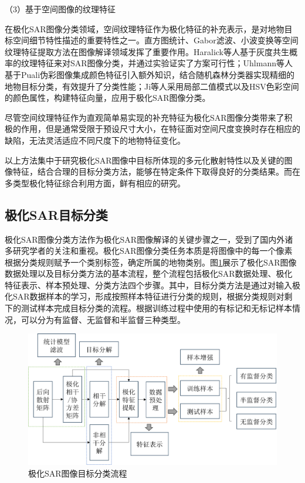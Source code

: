 （3）基于空间图像的纹理特征

在极化SAR图像分类领域，空间纹理特征作为极化特征的补充表示，是对地物目标空间细节特性描述的重要特性之一。直方图统计、Gabor滤波、小波变换等空间纹理特征提取方法在图像解译领域发挥了重要作用。Haralick等人基于灰度共生概率的纹理特征来对SAR图像分类，并通过实验证实了方案可行性；Uhlmann等人基于Puali伪彩图像集成颜色特征引入额外知识，结合随机森林分类器实现精细的地物目标分类，有效提升了分类性能；Ji等人采用局部二值模式以及HSV色彩空间的颜色属性，构建特征向量，应用于极化SAR图像分类。

尽管空间纹理特征作为直观简单易实现的补充特征为极化SAR图像分类带来了积极的作用，但是通常受限于预设尺寸大小，在特征面对空间尺度变换时存在相应的缺陷，无法灵活适应不同尺度下的地物特征变化。

以上方法集中于研究极化SAR图像中目标所体现的多元化散射特性以及关键的图像特征，结合合理的目标分类方法，能够在特定条件下取得良好的分类结果。而在多类型极化特征综合利用方面，鲜有相应的研究。

\subsection{极化SAR目标分类}
极化SAR图像分类方法作为极化SAR图像解译的关键步骤之一，受到了国内外诸多研究学者的关注和重视。极化SAR图像分类任务本质是将图像中的每一个像素根据分类规则赋予一个类别标签，确定所属的地物类别。图\ref{fig:极化SAR图像目标分类流程}展示了极化SAR图像数据处理以及目标分类方法的基本流程，整个流程包括极化SAR数据处理、极化特征表示、样本预处理、分类方法四个步骤。其中，目标分类方法是通过对输入极化SAR数据样本的学习，形成按照样本特征进行分类的规则，根据分类规则对剩下的测试样本完成目标分类的流程。根据训练过程中使用的有标记和无标记样本情况，可以分为有监督、无监督和半监督三种类型。

\begin{figure}[h]
  \includegraphics[width=12.3cm]{pic/chapter1/极化SAR分类流程.png}
  \caption{极化SAR图像目标分类流程}
  \label{fig:极化SAR图像目标分类流程}
\end{figure}


